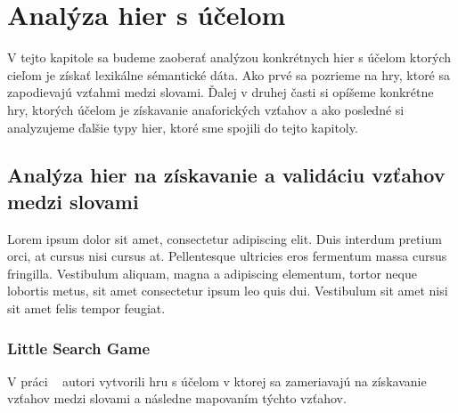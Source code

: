 \newpage

\section{Analýza hier s účelom}

V tejto kapitole sa budeme zaoberať analýzou konkrétnych hier s účelom ktorých cieľom je získať lexikálne sémantické dáta. Ako prvé sa pozrieme na hry, ktoré sa zapodievajú vzťahmi medzi slovami. Ďalej v druhej časti si opíšeme konkrétne hry, ktorých účelom je získavanie anaforických vzťahov a ako posledné si analyzujeme ďalšie typy hier, ktoré sme spojili do tejto kapitoly.



\subsection{Analýza hier na získavanie a validáciu vzťahov medzi slovami}

Lorem ipsum dolor sit amet, consectetur adipiscing elit. Duis interdum pretium orci, at cursus nisi cursus at. Pellentesque ultricies eros fermentum massa cursus fringilla. Vestibulum aliquam, magna a adipiscing elementum, tortor neque lobortis metus, sit amet consectetur ipsum leo quis dui. Vestibulum sit amet nisi sit amet felis tempor feugiat.


\subsubsection{Little Search Game}\label{podsekcia2}
V práci ~\cite{1} autori vytvorili hru s účelom v ktorej sa zameriavajú na získavanie vzťahov medzi slovami a následne mapovaním týchto vzťahov. 

